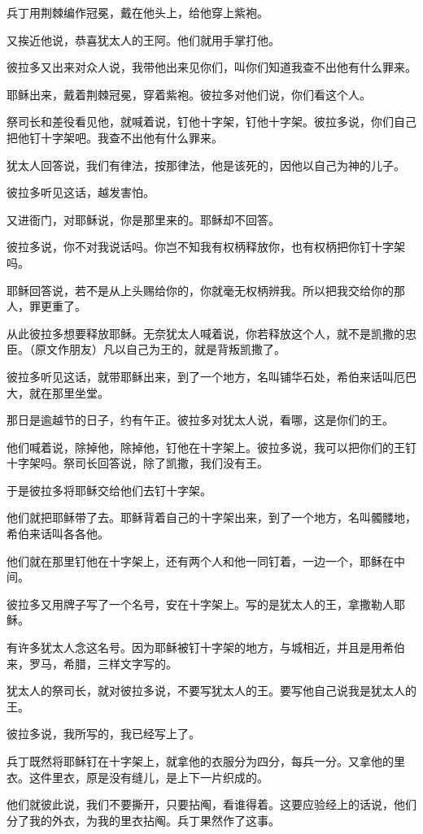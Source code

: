 \documentclass[12pt,oneside]{book}
\begin{document}
兵丁用荆棘编作冠冕，戴在他头上，给他穿上紫袍。

又挨近他说，恭喜犹太人的王阿。他们就用手掌打他。

彼拉多又出来对众人说，我带他出来见你们，叫你们知道我查不出他有什么罪来。

耶稣出来，戴着荆棘冠冕，穿着紫袍。彼拉多对他们说，你们看这个人。

祭司长和差役看见他，就喊着说，钉他十字架，钉他十字架。彼拉多说，你们自己把他钉十字架吧。我查不出他有什么罪来。

犹太人回答说，我们有律法，按那律法，他是该死的，因他以自己为神的儿子。

彼拉多听见这话，越发害怕。

又进衙门，对耶稣说，你是那里来的。耶稣却不回答。

彼拉多说，你不对我说话吗。你岂不知我有权柄释放你，也有权柄把你钉十字架吗。

耶稣回答说，若不是从上头赐给你的，你就毫无权柄辨我。所以把我交给你的那人，罪更重了。

从此彼拉多想要释放耶稣。无奈犹太人喊着说，你若释放这个人，就不是凯撒的忠臣。（原文作朋友）凡以自己为王的，就是背叛凯撒了。

彼拉多听见这话，就带耶稣出来，到了一个地方，名叫铺华石处，希伯来话叫厄巴大，就在那里坐堂。

那日是逾越节的日子，约有午正。彼拉多对犹太人说，看哪，这是你们的王。

他们喊着说，除掉他，除掉他，钉他在十字架上。彼拉多说，我可以把你们的王钉十字架吗。祭司长回答说，除了凯撒，我们没有王。

于是彼拉多将耶稣交给他们去钉十字架。

他们就把耶稣带了去。耶稣背着自己的十字架出来，到了一个地方，名叫髑髅地，希伯来话叫各各他。

他们就在那里钉他在十字架上，还有两个人和他一同钉着，一边一个，耶稣在中间。

彼拉多又用牌子写了一个名号，安在十字架上。写的是犹太人的王，拿撒勒人耶稣。

有许多犹太人念这名号。因为耶稣被钉十字架的地方，与城相近，并且是用希伯来，罗马，希腊，三样文字写的。

犹太人的祭司长，就对彼拉多说，不要写犹太人的王。要写他自己说我是犹太人的王。

彼拉多说，我所写的，我已经写上了。

兵丁既然将耶稣钉在十字架上，就拿他的衣服分为四分，每兵一分。又拿他的里衣。这件里衣，原是没有缝儿，是上下一片织成的。

他们就彼此说，我们不要撕开，只要拈阄，看谁得着。这要应验经上的话说，他们分了我的外衣，为我的里衣拈阄。兵丁果然作了这事。
\end{document}
